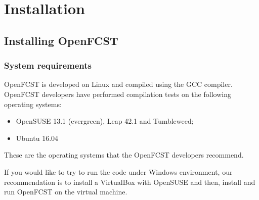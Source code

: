 \chapter{Installation} \label{Ch:installation}


\section{Installing OpenFCST} \label{installing_fcst}

\subsection{System requirements}

OpenFCST is developed on Linux and compiled using the GCC compiler. OpenFCST developers have performed compilation tests on the following operating systems:
\begin{itemize}
 \item OpenSUSE 13.1 (evergreen), Leap 42.1 and Tumbleweed;
 \item Ubuntu 16.04 
\end{itemize}
These are the operating systems that the OpenFCST developers recommend. 

If you would like to try to run the code under Windows environment, our recommendation is to install a VirtualBox with OpenSUSE and then, install and run OpenFCST on the virtual machine.

